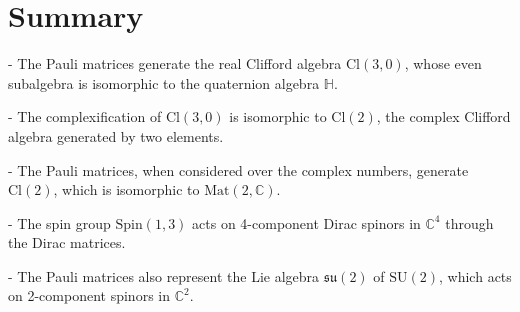 \documentclass{article}
\begin{document}
\section*{Summary}

- The Pauli matrices generate the real Clifford algebra $\text{Cl}(3,0)$,
whose even subalgebra is isomorphic to the quaternion algebra $\mathbb{H}$. 

- The complexification of $\text{Cl}(3,0)$ is isomorphic to $\text{Cl}(2)$,
the complex Clifford algebra generated by two elements. 

- The Pauli matrices, when considered over the complex numbers, generate $%
\text{Cl}(2)$, which is isomorphic to $\text{Mat}(2,\mathbb{C})$. 

- The spin group $\text{Spin}(1,3)$ acts on 4-component Dirac spinors in $%
\mathbb{C}^{4}$ through the Dirac matrices. 

- The Pauli matrices also represent the Lie algebra $\mathfrak{su}(2)$ of $%
\text{SU}(2)$, which acts on 2-component spinors in $\mathbb{C}^{2}$.
\end{document}
